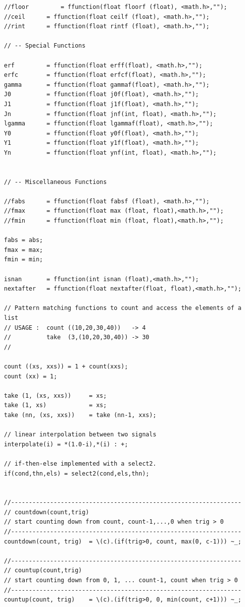\documentclass{article}
\begin{document}
\begin{lstlisting}[caption=\texttt{math.lib}]
//floor 		= ffunction(float floorf (float), <math.h>,"");
//ceil 		= ffunction(float ceilf (float), <math.h>,"");
//rint 		= ffunction(float rintf (float), <math.h>,"");

// -- Special Functions

erf			= ffunction(float erff(float), <math.h>,"");
erfc		= ffunction(float erfcf(float), <math.h>,"");
gamma		= ffunction(float gammaf(float), <math.h>,"");
J0			= ffunction(float j0f(float), <math.h>,"");
J1			= ffunction(float j1f(float), <math.h>,"");
Jn			= ffunction(float jnf(int, float), <math.h>,"");
lgamma		= ffunction(float lgammaf(float), <math.h>,"");
Y0			= ffunction(float y0f(float), <math.h>,"");
Y1			= ffunction(float y1f(float), <math.h>,"");
Yn			= ffunction(float ynf(int, float), <math.h>,"");


// -- Miscellaneous Functions

//fabs 		= ffunction(float fabsf (float), <math.h>,"");
//fmax 		= ffunction(float max (float, float),<math.h>,"");
//fmin 		= ffunction(float min (float, float),<math.h>,"");

fabs = abs;
fmax = max;
fmin = min;

isnan 		= ffunction(int isnan (float),<math.h>,"");
nextafter	= ffunction(float nextafter(float, float),<math.h>,"");

// Pattern matching functions to count and access the elements of a list
// USAGE : 	count ((10,20,30,40)) 	-> 4  
//			take  (3,(10,20,30,40)) -> 30
// 

count ((xs, xxs)) = 1 + count(xxs);
count (xx) = 1;

take (1, (xs, xxs)) 	= xs;
take (1, xs) 			= xs;
take (nn, (xs, xxs)) 	= take (nn-1, xxs);

// linear interpolation between two signals 
interpolate(i) = *(1.0-i),*(i) : +; 

// if-then-else implemented with a select2. 
if(cond,thn,els) = select2(cond,els,thn);


//-----------------------------------------------------------------
// countdown(count,trig) 
// start counting down from count, count-1,...,0 when trig > 0
//-----------------------------------------------------------------
countdown(count, trig)	= \(c).(if(trig>0, count, max(0, c-1))) ~_;

//-----------------------------------------------------------------
// countup(count,trig) 
// start counting down from 0, 1, ... count-1, count when trig > 0
//-----------------------------------------------------------------
countup(count, trig)	= \(c).(if(trig>0, 0, min(count, c+1))) ~_;


\end{lstlisting}
\end{document}
